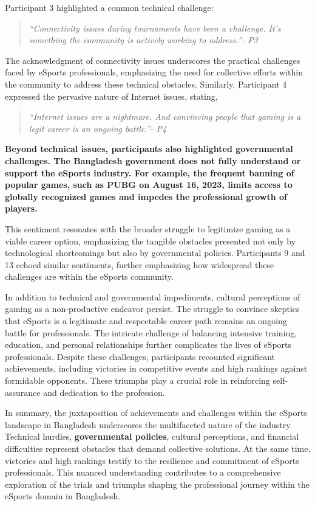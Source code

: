 \documentclass[manuscript,screen,review,anonymous]{acmart}
\begin{document}
Participant 3 highlighted a common technical challenge:

\begin{quote}
{\emph{``Connectivity issues during tournaments have been a challenge. It's something the community is actively working to address.''- P3}}
\end{quote} 

The acknowledgment of connectivity issues underscores the practical challenges faced by eSports professionals, emphasizing the need for collective efforts within the community to address these technical obstacles. Similarly, Participant 4 expressed the pervasive nature of Internet issues, stating, 

\begin{quote}
{\emph{``Internet issues are a nightmare. And convincing people that gaming is a legit career is an ongoing battle.''- P4}}
\end{quote} 

\textbf{Beyond technical issues, participants also highlighted governmental challenges. The Bangladesh government does not fully understand or support the eSports industry. For example, the frequent banning of popular games, such as PUBG on August 16, 2023, limits access to globally recognized games and impedes the professional growth of players.}

This sentiment resonates with the broader struggle to legitimize gaming as a viable career option, emphasizing the tangible obstacles presented not only by technological shortcomings but also by governmental policies. Participants 9 and 13 echoed similar sentiments, further emphasizing how widespread these challenges are within the eSports community.

In addition to technical and governmental impediments, cultural perceptions of gaming as a non-productive endeavor persist. The struggle to convince skeptics that eSports is a legitimate and respectable career path remains an ongoing battle for professionals. The intricate challenge of balancing intensive training, education, and personal relationships further complicates the lives of eSports professionals. Despite these challenges, participants recounted significant achievements, including victories in competitive events and high rankings against formidable opponents. These triumphs play a crucial role in reinforcing self-assurance and dedication to the profession.

In summary, the juxtaposition of achievements and challenges within the eSports landscape in Bangladesh underscores the multifaceted nature of the industry. Technical hurdles, \textbf{governmental policies}, cultural perceptions, and financial difficulties represent obstacles that demand collective solutions. At the same time, victories and high rankings testify to the resilience and commitment of eSports professionals. This nuanced understanding contributes to a comprehensive exploration of the trials and triumphs shaping the professional journey within the eSports domain in Bangladesh.
\end{document}
